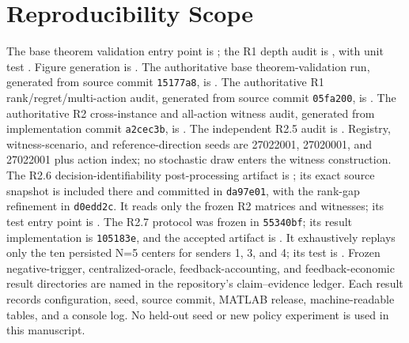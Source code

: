 \documentclass[10pt,twocolumn,twoside]{IEEEtran}
\begin{document}
\section{Reproducibility Scope}

The base theorem validation entry point is
; the R1 depth
audit is , with
unit test .  Figure generation is
.  The authoritative base
theorem-validation run, generated from source commit \texttt{15177a8}, is
.
The authoritative R1 rank/regret/multi-action audit, generated from source
commit \texttt{05fa200}, is
.
The authoritative R2 cross-instance and all-action witness audit, generated
from implementation commit \texttt{a2cec3b}, is
.
The independent R2.5 audit is
.  Registry,
witness-scenario, and reference-direction seeds are 27022001, 27020001, and
27022001 plus action index; no stochastic draw enters the witness construction.
The R2.6 decision-identifiability post-processing artifact is
; its exact
source snapshot is included there and committed in \texttt{da97e01}, with the
rank-gap refinement in \texttt{d0edd2c}.  It reads only the frozen R2 matrices
and witnesses; its test entry point is
.
The R2.7 protocol was frozen in \texttt{55340bf}; its result implementation is
\texttt{105183e}, and the accepted artifact is
.  It exhaustively
replays only the ten persisted N=5 centers for senders 1, 3, and 4; its test is
.
Frozen negative-trigger, centralized-oracle, feedback-accounting, and
feedback-economic result directories are named in the repository's
claim--evidence ledger.  Each result records configuration, seed, source
commit, MATLAB release, machine-readable tables, and a console log.  No
held-out seed or new policy experiment is used in this manuscript.



\end{document}
